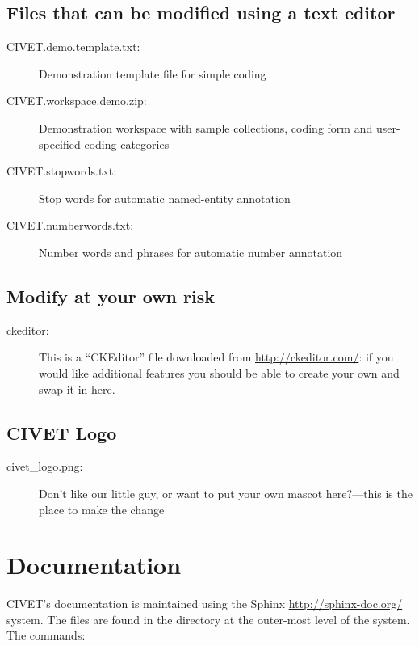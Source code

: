 \documentclass[letterpaper,10pt,english]{sphinxmanual}
\begin{document}
\subsection{Files that can be modified using a text editor}
\label{appendix3:files-that-can-be-modified-using-a-text-editor}\begin{description}
\item[{CIVET.demo.template.txt:}] \leavevmode
Demonstration template file for simple coding

\item[{CIVET.workspace.demo.zip:}] \leavevmode
Demonstration workspace with sample collections, coding form and
user-specified coding categories

\item[{CIVET.stopwords.txt:}] \leavevmode
Stop words for automatic named-entity annotation

\item[{CIVET.numberwords.txt:}] \leavevmode
Number words and phrases for automatic number annotation

\end{description}


\subsection{Modify at your own risk}
\label{appendix3:modify-at-your-own-risk}\begin{description}
\item[{ckeditor:}] \leavevmode
This is a “CKEditor” file downloaded from
\href{http://ckeditor.com/}{http://ckeditor.com/}: if you would like additional features you
should be able to create your own and swap it in here.

\end{description}


\subsection{CIVET Logo}
\label{appendix3:civet-logo}\begin{description}
\item[{civet\_logo.png:}] \leavevmode
Don’t like our little guy, or want to put your own mascot here?—this
is the place to make the change

\end{description}


\section{Documentation}
\label{appendix3:documentation}
CIVET's documentation is maintained using the Sphinx \href{http://sphinx-doc.org/}{http://sphinx-doc.org/} system.
The files are found in the  directory at the outer-most level of the system.
The commands:
\end{document}

